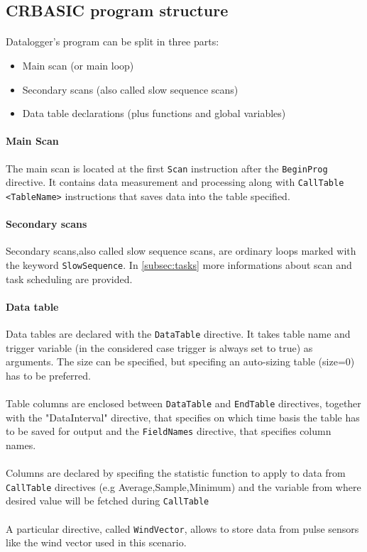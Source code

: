 \subsection{CRBASIC program structure}
\paragraph{}Datalogger's program can be split in three parts:
\begin{itemize}
	\item Main scan (or main loop)
	\item Secondary scans (also called slow sequence scans)
	\item Data table declarations (plus functions and global variables)
\end{itemize}
\paragraph{Main Scan}
The main scan is located at the first {\tt Scan} instruction after the {\tt BeginProg} directive.
It contains data measurement and processing along with {\tt CallTable <TableName>} instructions
that saves data into the table specified.
\paragraph{Secondary scans}
Secondary scans,also called slow sequence scans, 
are ordinary loops marked with the keyword {\tt SlowSequence}.
In \ref{subsec:tasks} more informations about scan and task scheduling are provided.
\paragraph{Data table}
Data tables are declared with the {\tt DataTable} directive. It takes table name and
trigger variable (in the considered case trigger is always set to true) as arguments.
The size can be specified, but specifing an auto-sizing table (size=0) has to be preferred.
\paragraph{} Table columns are enclosed between {\tt DataTable} and {\tt EndTable} directives, together with the "DataInterval"
directive, that specifies on which time basis the table has to be saved for output
and the {\tt FieldNames} directive, that specifies column names.
\paragraph{}Columns are declared by specifing the statistic function 
to apply to data from {\tt CallTable} directives (e.g Average,Sample,Minimum)
and the variable from where desired value will be fetched during {\tt CallTable}
\paragraph{} A particular directive, called {\tt WindVector}, allows to store
data from pulse sensors like the wind vector used in this scenario.